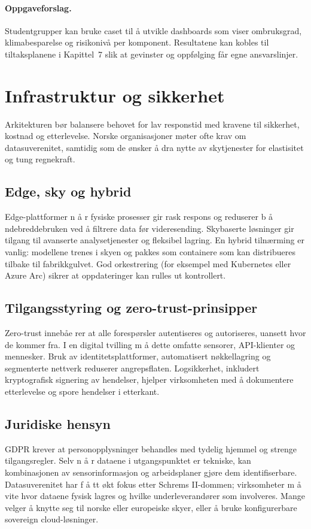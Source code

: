 \paragraph{Oppgaveforslag.} Studentgrupper kan bruke caset til å utvikle dashboards som viser ombruksgrad, klimabesparelse og risikonivå per komponent.
Resultatene kan kobles til tiltaksplanene i Kapittel~7 slik at gevinster og oppfølging får egne ansvarslinjer.

\section{Infrastruktur og sikkerhet}
Arkitekturen bør balansere behovet for lav responstid med kravene til sikkerhet, kostnad og etterlevelse. Norske organisasjoner møter ofte krav om datasuverenitet, samtidig som de ønsker  å dra nytte av skytjenester for elastisitet og tung regnekraft.

\subsection{Edge, sky og hybrid}
Edge-plattformer n å r fysiske prosesser gir rask respons og reduserer b å ndebreddebruken ved  å filtrere data før videresending. Skybaserte løsninger gir tilgang til avanserte analysetjenester og fleksibel lagring. En hybrid tilnærming er vanlig: modellene trenes i skyen og pakkes som containere som kan distribueres tilbake til fabrikkgulvet. God orkestrering (for eksempel med Kubernetes eller Azure Arc) sikrer at oppdateringer kan rulles ut kontrollert.

\subsection{Tilgangsstyring og zero-trust-prinsipper}
Zero-trust innebåe rer at alle forespørsler autentiseres og autoriseres, uansett hvor de kommer fra. I en digital tvilling m å dette omfatte sensorer, API-klienter og mennesker. Bruk av identitetsplattformer, automatisert nøkkellagring og segmenterte nettverk reduserer angrepsflaten. Logsikkerhet, inkludert kryptografisk signering av hendelser, hjelper virksomheten med  å dokumentere etterlevelse og spore hendelser i etterkant.

\subsection{Juridiske hensyn}
GDPR krever at personopplysninger behandles med tydelig hjemmel og strenge tilgangsregler. Selv n å r dataene i utgangspunktet er tekniske, kan kombinasjonen av sensorinformasjon og arbeidsplaner gjøre dem identifiserbare. Datasuverenitet har f å tt økt fokus etter Schrems II-dommen; virksomheter m å vite hvor dataene fysisk lagres og hvilke underleverandører som involveres. Mange velger  å knytte seg til norske eller europeiske skyer, eller  å bruke konfigurerbare sovereign cloud-løsninger.


